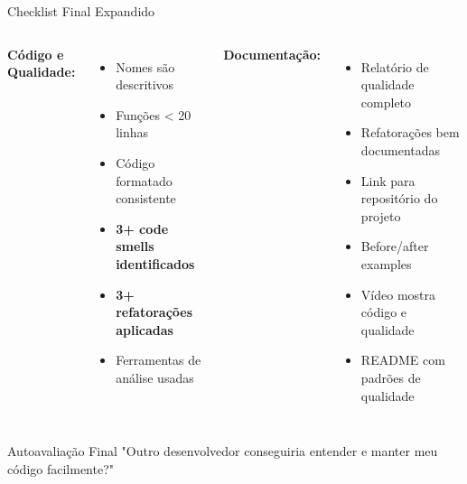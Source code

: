\documentclass[10pt]{beamer}
\begin{document}
\begin{frame}{Checklist Final Expandido}
\begin{columns}[t]
\textbf{Código e Qualidade:}
\begin{itemize}
    \item[\checkmark] Nomes são descritivos
    \item[\checkmark] Funções < 20 linhas
    \item[\checkmark] Código formatado consistente
    \item[\checkmark] \textbf{3+ code smells identificados}
    \item[\checkmark] \textbf{3+ refatorações aplicadas}
    \item[\checkmark] Ferramentas de análise usadas
\end{itemize}

\textbf{Documentação:}
\begin{itemize}
    \item[\checkmark] Relatório de qualidade completo
    \item[\checkmark] Refatorações bem documentadas
    \item[\checkmark] Link para repositório do projeto
    \item[\checkmark] Before/after examples
    \item[\checkmark] Vídeo mostra código e qualidade
    \item[\checkmark] README com padrões de qualidade
\end{itemize}
\end{columns}

\vspace{0.5cm}
\begin{block}{Autoavaliação Final}
"Outro desenvolvedor conseguiria entender e manter meu código facilmente?"
\end{block}
\end{frame}
\end{document}
